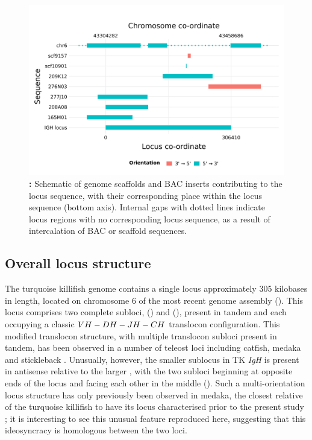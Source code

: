 \begin{figure}
\centering
\includegraphics[width=\textwidth]{_Figures/png/nfu-locus-aln}
\caption[]{\textbf{:} Schematic of genome scaffolds and BAC inserts contributing to the \Nfu \igh{} locus sequence, with their corresponding place within the locus sequence (bottom axis). Internal gaps with dotted lines indicate locus regions with no corresponding locus sequence, as a result of intercalation of BAC or scaffold sequences.}
\label{fig:nfu-locus-aln}
\end{figure}

\subsection{Overall locus structure}
\label{sec:nfu-locus-structure}
	
The turquoise killifish genome contains a single \igh{} locus approximately 305 kilobases in length, located on chromosome 6 of the most recent \Nfu genome assembly (). This locus comprises two complete subloci,  () and  (), present in tandem and each occupying a classic ${VH-DH-JH-CH}$ translocon configuration. This modified translocon structure, with multiple translocon subloci present in tandem, has been observed in a number of teleost \igh{} loci including catfish, medaka and stickleback \parencite{fillatreau2013astonishing}. Unusually, however, the smaller  sublocus in TK \textit{IgH} is present in antisense relative to the larger , with the two subloci beginning at opposite ends of the locus and facing each other in the middle (). Such a multi-orientation locus structure has only previously been observed in medaka, the closest relative of the turquoise killifish to have its locus characterised prior to the present study \parencite{magadan2011medaka}; it is interesting to see this unusual feature reproduced here, suggesting that this ideosyncracy is homologous between the two loci.
	
